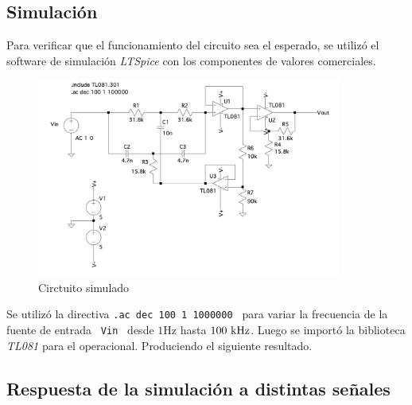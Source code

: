 \subsection*{Simulaci\'on}
	Para verificar que el funcionamiento del circuito sea el esperado, se utiliz\'o el software de simulaci\'on \textit{LTSpice} con los componentes de valores comerciales. 
\begin{figure}[hbt]
	\centering
	\includegraphics[width=10cm]{imagenes/simulacion}
	\caption{Circtuito simulado}
\end{figure}

	
Se utiliz\'o la directiva \texttt{.ac dec 100 1 1000000 } para
variar la  frecuencia de la fuente de entrada \texttt{ Vin } desde  $1 \si{\hertz}$ hasta $100 \ \si{\kilo\hertz}$. Luego se import\'o la biblioteca \textit{TL081} para el operacional. Produciendo el siguiente resultado.


\subsection*{Respuesta de la simulaci\'on a distintas señales}

